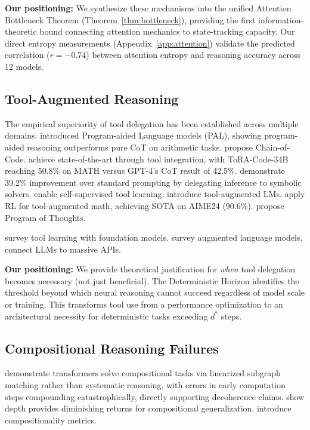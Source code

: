 \documentclass{article}
\theoremstyle{plain}
\theoremstyle{definition}
\theoremstyle{remark}
\begin{document}
\textbf{Our positioning:} We synthesize these mechanisms into the unified Attention Bottleneck Theorem (Theorem~\ref{thm:bottleneck}), providing the first information-theoretic bound connecting attention mechanics to state-tracking capacity. Our direct entropy measurements (Appendix~\ref{app:attention}) validate the predicted correlation ($r = -0.74$) between attention entropy and reasoning accuracy across 12 models.

\subsection{Tool-Augmented Reasoning}

The empirical superiority of tool delegation has been established across multiple domains. \citet{gao2023pal} introduced Program-aided Language models (PAL), showing program-aided reasoning outperforms pure CoT on arithmetic tasks. \citet{li2023chaincode} propose Chain-of-Code. \citet{gou2024tora} achieve state-of-the-art through tool integration, with ToRA-Code-34B reaching 50.8\% on MATH versus GPT-4's CoT result of 42.5\%. \citet{pan2024logiclm} demonstrate 39.2\% improvement over standard prompting by delegating inference to symbolic solvers. \citet{schick2023toolformer} enable self-supervised tool learning. \citet{parisi2022talm} introduce tool-augmented LMs. \citet{luo2026agentmath} apply RL for tool-augmented math, achieving SOTA on AIME24 (90.6\%). \citet{chen2023program} propose Program of Thoughts.

\citet{qin2024tool} survey tool learning with foundation models. \citet{mialon2023augmented} survey augmented language models. \citet{patil2023gorilla} connect LLMs to massive APIs.

\textbf{Our positioning:} We provide theoretical justification for \emph{when} tool delegation becomes necessary (not just beneficial). The Deterministic Horizon identifies the threshold beyond which neural reasoning cannot succeed regardless of model scale or training. This transforms tool use from a performance optimization to an architectural necessity for deterministic tasks exceeding $d^*$ steps.

\subsection{Compositional Reasoning Failures}

\citet{dziri2024faith} demonstrate transformers solve compositional tasks via linearized subgraph matching rather than systematic reasoning, with errors in early computation steps compounding catastrophically, directly supporting decoherence claims. \citet{petty2024depth} show depth provides diminishing returns for compositional generalization. \citet{press2023measuring} introduce compositionality metrics.
\end{document}
